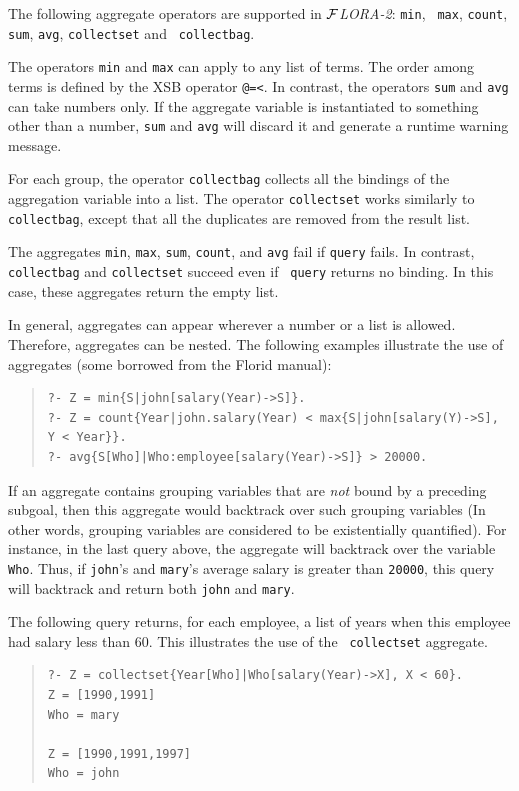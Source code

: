 \documentclass[11pt]{article}
\newcommand{\FLORA}{{\mbox{${\cal F}${\small\it LORA}\rm\emph{-2}}}\xspace}
\newcommand{\FLORID}{{\mbox{\sc Florid}}\xspace}
\begin{document}
%
The following aggregate operators are supported in \FLORA: {\tt min}, {\tt
  max}, {\tt count}, {\tt sum}, {\tt avg}, {\tt collectset} and {\tt
  collectbag}.

The operators {\tt min} and {\tt max} can apply to any list of
terms. The order among terms is defined by the XSB operator {\tt @=<}.  In
contrast, the operators {\tt sum} and {\tt avg} can take numbers only. If
the aggregate variable is instantiated to something other than a
number, {\tt sum} and {\tt avg} will discard it and generate a runtime
warning message.

For each group, the operator {\tt collectbag} collects all the bindings of
the aggregation variable into a list. The operator {\tt collectset} works
similarly to {\tt collectbag}, except that all the duplicates are removed
from the result list.


The aggregates {\tt min}, {\tt max}, {\tt sum}, {\tt count}, and {\tt avg}
fail if {\tt query} fails.
In contrast, {\tt collectbag} and {\tt collectset} succeed even if {\tt
  query} returns no binding. In this case, these aggregates return the
empty list.

In general, aggregates can appear wherever a number or a list is
allowed. Therefore, aggregates can be nested. The following examples
illustrate the use of aggregates (some borrowed from the \FLORID manual):
\begin{quote}
\begin{verbatim}
?- Z = min{S|john[salary(Year)->S]}.
?- Z = count{Year|john.salary(Year) < max{S|john[salary(Y)->S], Y < Year}}.
?- avg{S[Who]|Who:employee[salary(Year)->S]} > 20000. 
\end{verbatim}
\end{quote}
If an aggregate contains grouping variables that are \emph{not} bound
by a preceding subgoal, then this aggregate would backtrack over such
grouping variables (In other words, grouping variables are considered to be
existentially quantified). For instance, in the last query above, the
aggregate will backtrack over the variable {\tt Who}. Thus, if
{\tt john}'s and {\tt mary}'s average salary is greater than {\tt 20000},
this query will backtrack and return both {\tt john} and {\tt mary}.

The following query returns, for each employee, a list of years when this
employee had salary less than 60. This illustrates the use of the {\tt
  collectset} aggregate.
\begin{quote}
\begin{verbatim}
?- Z = collectset{Year[Who]|Who[salary(Year)->X], X < 60}.
Z = [1990,1991]
Who = mary

Z = [1990,1991,1997]
Who = john
\end{verbatim}
\end{quote}
\end{document}
